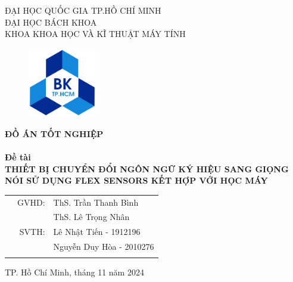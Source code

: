 \documentclass[a4paper]{article}
\begin{document}
\begin{titlepage}
\begin{center}
ĐẠI HỌC QUỐC GIA TP.HỒ CHÍ MINH \\
ĐẠI HỌC BÁCH KHOA \\
KHOA KHOA HỌC VÀ KĨ THUẬT MÁY TÍNH
\end{center}

\vspace{1cm}

\begin{figure}[h!]
\begin{center}
\includegraphics[width=3cm]{hcmut.png}
\end{center}
\end{figure}

\vspace{1cm}

\begin{center}
\textbf{\Large ĐỒ ÁN TỐT NGHIỆP}\\
\hrulefill \\
\vspace{.3cm}
\textbf{\Large Đề tài}\\
\vspace{.3cm}
\textbf{\Large THIẾT BỊ CHUYỂN ĐỔI NGÔN NGỮ KÝ HIỆU SANG GIỌNG NÓI SỬ DỤNG FLEX SENSORS KẾT HỢP VỚI HỌC MÁY
 } \\
\hrulefill
\end{center}


\vspace{3cm}

\begin{table}[h]
\begin{tabular}{rrl}
\hspace{5 cm} & GVHD: & ThS. Trần Thanh Bình\\
& &  ThS. Lê Trọng Nhân  \\
& SVTH: & Lê Nhật Tiến - 1912196 \\
& & Nguyễn Duy Hòa - 2010276  \\
& & \\
\end{tabular}
\end{table}

\begin{center}
{\footnotesize TP. Hồ Chí Minh, tháng 11 năm 2024}
\end{center}
\end{titlepage}
\end{document}

